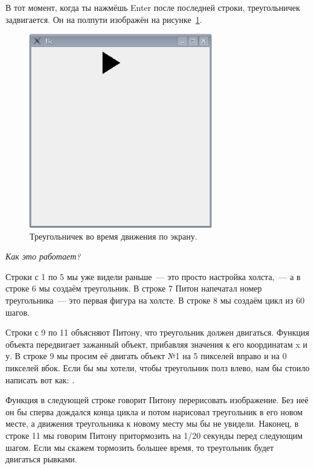 В тот момент, когда ты нажмёшь Enter после последней строки, треугольничек задвигается. Он на полпути изображён на рисунке \ref{fig44}.

\begin{figure}
\begin{center}
\includegraphics[width=80mm]{../en/figure44.eps}
\end{center}
\caption{Треугольничек во время движения по экрану.}\label{fig44}
\end{figure}

\par
\emph{Как это работает?}
\par

Строки с 1 по 5 мы уже видели раньше — это просто настройка холста, — а в строке 6 мы создаём треугольник. В строке 7 Питон напечатал номер треугольника — это первая фигура на холсте. В строке 8 мы создаём цикл из 60 шагов.

Строки с 9 по 11 объясняют Питону, что треугольник должен двигаться. Функция  объекта  передвигает зажанный объект, прибавляя значения к его координатам x и у. В строке 9 мы просим её двигать объект №1 на 5 пикселей вправо и на 0 пикселей вбок. Если бы мы хотели, чтобы треугольник полз влево, нам бы стоило написать вот как: .

Функция  в следующей строке говорит Питону перерисовать изображение. Без неё он бы сперва дождался конца цикла и потом нарисовал треугольник в его новом месте, а движения треугольника к новому месту мы бы не увидели. Наконец, в строке 11 мы говорим Питону притормозить на 1/20 секунды перед следующим шагом. Если мы скажем тормозить большее время, то треугольник будет двигаться рывками.

